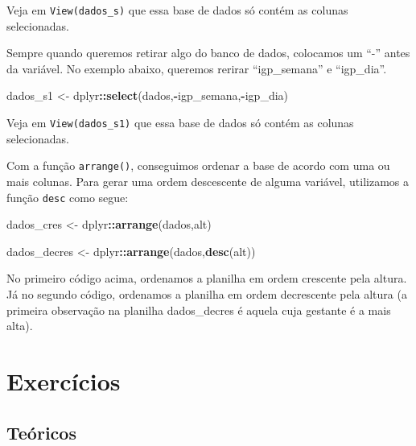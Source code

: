 \documentclass[
]{book}
\newenvironment{Shaded}{\begin{snugshade}}{\end{snugshade}}
\newcommand{\KeywordTok}[1]{\textcolor[rgb]{0.13,0.29,0.53}{\textbf{#1}}}
\newcommand{\NormalTok}[1]{#1}
\newcommand{\OperatorTok}[1]{\textcolor[rgb]{0.81,0.36,0.00}{\textbf{#1}}}
\newcommand{\StringTok}[1]{\textcolor[rgb]{0.31,0.60,0.02}{#1}}
\begin{document}
Veja em \texttt{View(dados\_s)} que essa base de dados só contém as colunas selecionadas.

Sempre quando queremos retirar algo do banco de dados, colocamos um ``-'' antes da variável. No exemplo abaixo, queremos rerirar ``igp\_semana'' e ``igp\_dia''.

\begin{Shaded}
\begin{Highlighting}[]
\NormalTok{dados_s1 <-}\StringTok{ }\NormalTok{dplyr}\OperatorTok{::}\KeywordTok{select}\NormalTok{(dados,}\OperatorTok{-}\NormalTok{igp_semana,}\OperatorTok{-}\NormalTok{igp_dia)}
\end{Highlighting}
\end{Shaded}

Veja em \texttt{View(dados\_s1)} que essa base de dados só contém as colunas selecionadas.

Com a função \texttt{arrange()}, conseguimos ordenar a base de acordo com uma ou mais colunas. Para gerar uma ordem descescente de alguma variável, utilizamos a função \texttt{desc} como segue:

\begin{Shaded}
\begin{Highlighting}[]
\NormalTok{dados_cres <-}\StringTok{ }\NormalTok{dplyr}\OperatorTok{::}\KeywordTok{arrange}\NormalTok{(dados,alt)}
\end{Highlighting}
\end{Shaded}

\begin{Shaded}
\begin{Highlighting}[]
\NormalTok{dados_decres <-}\StringTok{ }\NormalTok{dplyr}\OperatorTok{::}\KeywordTok{arrange}\NormalTok{(dados,}\KeywordTok{desc}\NormalTok{(alt))}
\end{Highlighting}
\end{Shaded}

No primeiro código acima, ordenamos a planilha em ordem crescente pela altura. Já no segundo código, ordenamos a planilha em ordem decrescente pela altura (a primeira observação na planilha dados\_decres é aquela cuja gestante é a mais alta).

\hypertarget{exercuxedcios}{%
\section{Exercícios}\label{exercuxedcios}}

\hypertarget{teuxf3ricos}{%
\subsection{Teóricos}\label{teuxf3ricos}}
\end{document}
